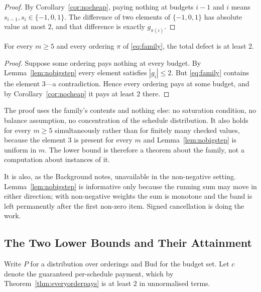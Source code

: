 \begin{proof}
By Corollary~\ref{cor:nocheap}, paying nothing at budgets $i-1$ and $i$ means
$s_{i-1},s_{i}\in\{-1,0,1\}$. The difference of two elements of $\{-1,0,1\}$ has absolute
value at most $2$, and that difference is exactly $g_{\pi(i)}$.
\end{proof}


\begin{theorem}
\label{thm:everyorderpays}
For every $m\ge5$ and every ordering $\pi$ of \eqref{eq:family}, the total defect is at least
$2$.
\end{theorem}

\begin{proof}
Suppose some ordering pays nothing at every budget. By Lemma~\ref{lem:nobigstep} every
element satisfies $|g_{i}|\le2$. But \eqref{eq:family} contains the element $3$---a
contradiction. Hence every ordering pays at some budget, and by
Corollary~\ref{cor:nocheap} it pays at least $2$ there.
\end{proof}


The proof uses the family's contents and nothing else: no saturation condition, no balance
assumption, no concentration of the schedule distribution. It also holds for every $m\ge5$
simultaneously rather than for finitely many checked values, because the element $3$ is
present for every $m$ and Lemma~\ref{lem:nobigstep} is uniform in $m$. The lower bound is
therefore a theorem about the family, not a computation about instances of it.

It is also, as the Background notes, unavailable in the non-negative setting.
Lemma~\ref{lem:nobigstep} is informative only because the running sum may move in either
direction; with non-negative weights the sum is monotone and the band is left permanently
after the first non-zero item. Signed cancellation is doing the work.

\subsection{The Two Lower Bounds and Their Attainment}
\label{sec:bounds}

Write $P$ for a distribution over orderings and $\mathrm{Bud}$ for the budget set. Let $c$
denote the guaranteed per-schedule payment, which by Theorem~\ref{thm:everyorderpays} is at
least $2$ in unnormalised terms.

